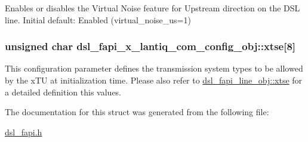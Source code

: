 Enables or disables the Virtual Noise feature for Upstream direction on the D\-S\-L line. Initial default\-: Enabled (virtual\-\_\-noise\-\_\-us=1) \hypertarget{structdsl__fapi__x__lantiq__com__config__obj_ae7d116c23356c0403fbb3b40ff55edbd}{
\subsubsection[{xtse}]{\setlength{\rightskip}{0pt plus 5cm}unsigned char dsl\-\_\-fapi\-\_\-x\-\_\-lantiq\-\_\-com\-\_\-config\-\_\-obj\-::xtse\mbox{[}8\mbox{]}}}\label{structdsl__fapi__x__lantiq__com__config__obj_ae7d116c23356c0403fbb3b40ff55edbd}
This configuration parameter defines the transmission system types to be allowed by the x\-T\-U at initialization time. Please also refer to \hyperlink{structdsl__fapi__line__obj_af8a2b118576e853690ab301ce3d05c63}{dsl\-\_\-fapi\-\_\-line\-\_\-obj\-::xtse} for a detailed definition this values. 

The documentation for this struct was generated from the following file\-:\begin{DoxyCompactItemize}
\item 
\hyperlink{dsl__fapi_8h}{dsl\-\_\-fapi.\-h}\end{DoxyCompactItemize}
